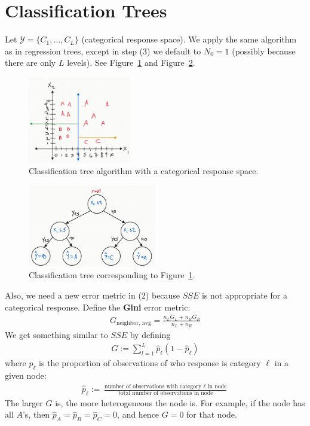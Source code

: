 \documentclass[12pt, a4paper]{article}
\theoremstyle{definition}
\begin{document}
	\section*{Classification Trees}
	Let $\mathcal{Y} = \{C_1, \ldots, C_L\}$ (categorical response space).
	We apply the same algorithm as in regression trees, except in step (3)
	we default to $N_0 = 1$ (possibly because there are only $L$ levels).
	See Figure~\ref{fig:dynamic-split-categorical-data} and
	Figure~\ref{fig:classification-tree}.
	\begin{figure}
		\centering
		\includegraphics[width=0.4\textwidth]{dynamic-split-categorical-data}
		\caption{Classification tree algorithm with a categorical response space.}
		\label{fig:dynamic-split-categorical-data}
	\end{figure}
	\begin{figure}
		\centering
		\includegraphics[width=0.5\textwidth]{classification-tree}
		\caption{Classification tree corresponding to
			Figure~\ref{fig:dynamic-split-categorical-data}.}
		\label{fig:classification-tree}
	\end{figure}
	Also, we need a new error metric in (2) because $SSE$ is not appropriate for
	a categorical response. Define the \textbf{Gini} error metric:
	\begin{align*}
		G_{\text{neighbor, avg}} = \frac{n_L G_L + n_R G_R}{n_L + n_R}
	\end{align*}
	We get something similar to $SSE$ by defining
	\begin{align*}
		G := \sum_{l=1}^{L}\hat{p}_\ell(1 - \hat{p}_\ell)
	\end{align*}
	where $\hat{p}_\ell$ is the proportion of observations of who response
	is category $\ell$ in a given node:
	\begin{align*}
		\hat{p}_\ell := \frac{
		\text{number of observations with category $\ell$ in node}}
		{\text{total number of observations in node}}
	\end{align*}
	The larger $G$ is, the more heterogeneous the node is. For example, if the
	node has all $A$'s, then $\hat{p}_A = \hat{p}_B = \hat{p}_C = 0$, and
	hence $G=0$ for that node.
	\pagebreak
	\printbibliography
\end{document}
